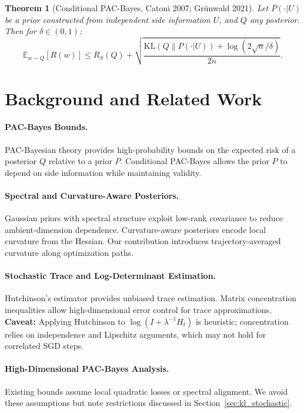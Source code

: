 \documentclass[11pt]{article}
\newtheorem{theorem}{Theorem}[section]
\begin{document}
\begin{theorem}[Conditional PAC-Bayes, Catoni 2007; Grünwald 2021]
Let $P(\cdot|U)$ be a prior constructed from independent side information $U$, and $Q$ any posterior.  
Then for $\delta\in(0,1)$:
\[
\mathbb{E}_{w\sim Q}[R(w)] \le R_S(Q) + \sqrt{\frac{\mathrm{KL}(Q\|P(\cdot|U)) + \log(2\sqrt{n}/\delta)}{2n}}.
\]
\end{theorem}

\section{Background and Related Work}

\paragraph{PAC-Bayes Bounds.}
PAC-Bayesian theory \cite{mcallester1999pac,catoni2007pac} provides high-probability bounds on the expected risk of a posterior $Q$ relative to a prior $P$.  
Conditional PAC-Bayes \cite{grunwald2021pac} allows the prior $P$ to depend on side information while maintaining validity.

\paragraph{Spectral and Curvature-Aware Posteriors.}
Gaussian priors with spectral structure \cite{dziugaite2017computing,dziugaite2018data} exploit low-rank covariance to reduce ambient-dimension dependence.  
Curvature-aware posteriors \cite{martens2014new,maclaurin2015gradient} encode local curvature from the Hessian.  
Our contribution introduces trajectory-averaged curvature along optimization paths.

\paragraph{Stochastic Trace and Log-Determinant Estimation.}
Hutchinson’s estimator \cite{hutchinson1990stochastic} provides unbiased trace estimation.  
Matrix concentration inequalities \cite{tropp2012user,avron2011randomized} allow high-dimensional error control for trace approximations.  
\textbf{Caveat:} Applying Hutchinson to $\log(I+\lambda^{-1}H_t)$ is heuristic; concentration relies on independence and Lipschitz arguments, which may not hold for correlated SGD steps.

\paragraph{High-Dimensional PAC-Bayes Analysis.}
Existing bounds \cite{dziugaite2017computing,neyshabur2017exploring} assume local quadratic losses or spectral alignment.  
We avoid these assumptions but note restrictions discussed in Section~\ref{sec:kl_stochastic}.
\end{document}

